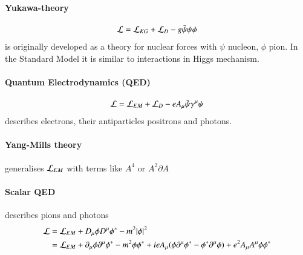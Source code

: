 \paragraph{Yukawa-theory}
\begin{align*}
	\mathcal{L} = \mathcal{L}_{KG} + \mathcal{L}_{D} - g \bar{\psi}\psi \phi
\end{align*}
is originally developed as a theory for nuclear forces with $\psi$ nucleon, $\phi$ pion. In the Standard Model it is similar to interactions in Higgs mechanism.
\paragraph{Quantum Electrodynamics (QED)}
\begin{align*}
	\mathcal{L} = \mathcal{L}_{EM} + \mathcal{L}_{D} - eA_\mu \bar{\psi} \gamma^\mu \psi
\end{align*}
describes electrons, their antiparticles positrons and photons.

\paragraph{Yang-Mills theory}
generalises $\mathcal{L}_{EM}$ with terms like $A^4$ or $A^2 \partial A$
\paragraph{Scalar QED}
describes pions and photons
\begin{align*}
	\begin{split}
		\mathcal{L} &= \mathcal{L}_{EM} + D_\mu \phi D^\mu\phi^* - m^2 |\phi|^2 \\
			 &= \mathcal{L}_{EM} + \partial_\mu\phi\partial^\mu\phi^* - m^2 \phi\phi^* + ie A_\mu(\phi\partial^\mu\phi^* - \phi^* \partial^\mu\phi) + e^2 A_\mu A^\mu \phi\phi^*
	\end{split}
\end{align*}
